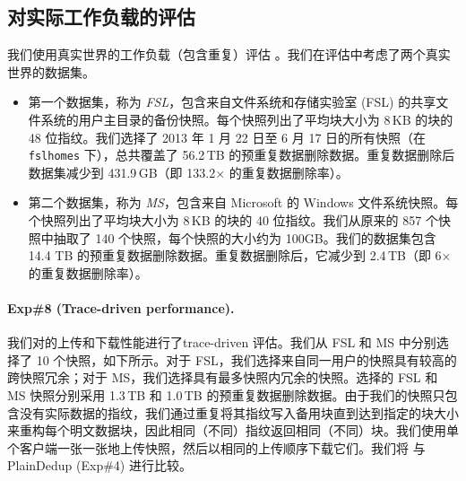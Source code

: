 \subsection{对实际工作负载的评估}
\label{subsec:sgxdedup-real-world}

我们使用真实世界的工作负载（包含重复）评估 \sysnameS。我们在评估中考虑了两个真实世界的数据集。
\begin{itemize}[leftmargin=*]
\item 第一个数据集，称为 \textit{ FSL}，包含来自文件系统和存储实验室 (FSL) \cite{fsl,sun16} 的共享文件系统的用户主目录的备份快照。每个快照列出了平均块大小为 8\,KB 的块的 48 位指纹。我们选择了 2013 年 1 月 22 日至 6 月 17 日的所有快照（在 \texttt{fslhomes} 下），总共覆盖了 56.2\,TB 的预重复数据删除数据。重复数据删除后数据集减少到 431.9\,GB（即 133.2$\times$ 的重复数据删除率）。
\item 第二个数据集，称为 \textit{ MS}，包含来自 Microsoft \cite{meyer11} 的 Windows 文件系统快照。每个快照列出了平均块大小为 8\,KB 的块的 40 位指纹。我们从原来的 857 个快照中抽取了 140 个快照，每个快照的大小约为 100GB。我们的数据集包含 14.4 TB 的预重复数据删除数据。重复数据删除后，它减少到 2.4\,TB（即 6$\times$ 的重复数据删除率）。
\end{itemize}



\paragraph*{Exp\#8 (Trace-driven performance).} 我们对\sysnameS 的上传和下载性能进行了trace-driven 评估。我们从 FSL 和 MS 中分别选择了 10 个快照，如下所示。对于 FSL，我们选择来自同一用户的快照具有较高的跨快照冗余；对于 MS，我们选择具有最多快照内冗余的快照。选择的 FSL 和 MS 快照分别采用 1.3\,TB 和 1.0\,TB 的预重复数据删除数据。由于我们的快照只包含没有实际数据的指纹，我们通过重复将其指纹写入备用块直到达到指定的块大小来重构每个明文数据块，因此相同（不同）指纹返回相同（不同）块。我们使用单个客户端一张一张地上传快照，然后以相同的上传顺序下载它们。我们将 \sysnameS 与 PlainDedup (Exp\#4) 进行比较。

